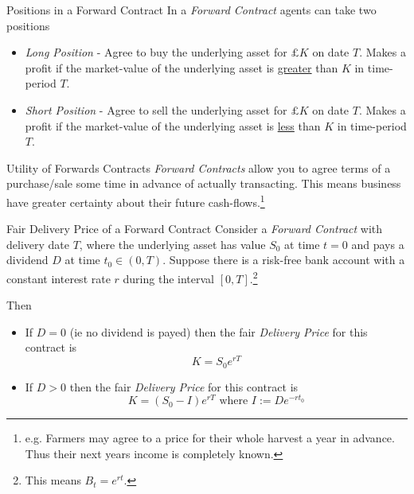 \documentclass[11pt,a4paper]{article}
\begin{document}
  \begin{remark}{Positions in a Forward Contract}
    In a \textit{Forward Contract} agents can take two positions
    \begin{itemize}
      \item \textit{Long Position} - Agree to buy the underlying asset for $\pounds K$ on date $T$. Makes a profit if the market-value of the underlying asset is \underline{greater} than $K$ in time-period $T$.
      \item \textit{Short Position} - Agree to sell the underlying asset for $\pounds K$ on date $T$. Makes a profit if the market-value of the underlying asset is \underline{less} than $K$ in time-period $T$.
    \end{itemize}
  \end{remark}

  \begin{remark}{Utility of Forwards Contracts}
    \textit{Forward Contracts} allow you to agree terms of a purchase/sale some time in advance of actually transacting. This means business have greater certainty about their future cash-flows.\footnote{e.g. Farmers may agree to a price for their whole harvest a year in advance. Thus their next years income is completely known.}
  \end{remark}

  \begin{theorem}{Fair Delivery Price of a Forward Contract}\label{the_fair_price_of_a_forward_contract}
    Consider a \textit{Forward Contract} with delivery date $T$, where the underlying asset has value $S_0$ at time $t=0$ and pays a dividend $D$ at time $t_0\in(0,T)$. Suppose there is a risk-free bank account with a constant interest rate $r$ during the interval $[0,T]$.\footnote{This means $B_t=e^{rt}$.}
    \par Then
    \begin{itemize}
      \item If $D=0$ (ie no dividend is payed) then the fair \textit{Delivery Price} for this contract is
      \[ K=S_0e^{rT} \]
      \item If $D>0$ then the fair \textit{Delivery Price} for this contract is
      \[ K=(S_0-I)e^{rT}\text{ where }I:=De^{-rt_0} \]
    \end{itemize}
  \end{theorem}
\end{document}
